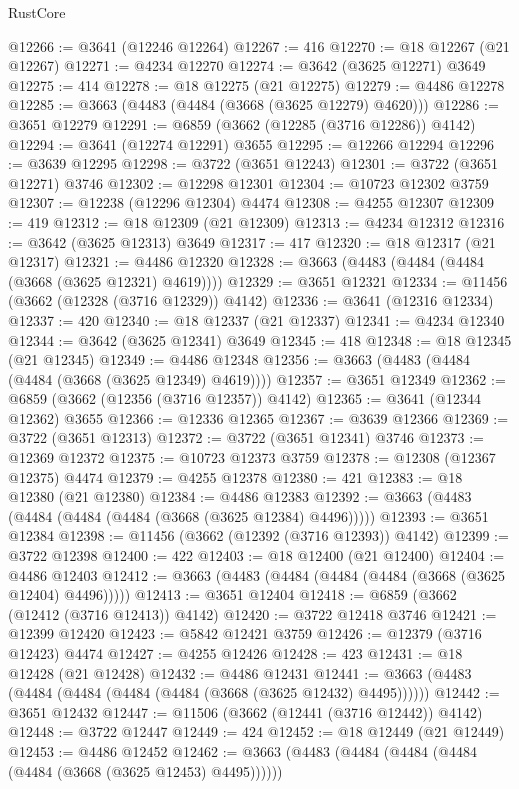 \begin{lexlean}{RustCore}
\begin{coremodule}
@12266 := @3641 (@12246 @12264)
@12267 := 416
@12270 := @18 @12267 (@21 @12267)
@12271 := @4234 @12270
@12274 := @3642 (@3625 @12271) @3649
@12275 := 414
@12278 := @18 @12275 (@21 @12275)
@12279 := @4486 @12278
@12285 := @3663 (@4483 (@4484 (@3668 (@3625 @12279) @4620)))
@12286 := @3651 @12279
@12291 := @6859 (@3662 (@12285 (@3716 @12286)) @4142)
@12294 := @3641 (@12274 @12291) @3655
@12295 := @12266 @12294
@12296 := @3639 @12295
@12298 := @3722 (@3651 @12243)
@12301 := @3722 (@3651 @12271) @3746
@12302 := @12298 @12301
@12304 := @10723 @12302 @3759
@12307 := @12238 (@12296 @12304) @4474
@12308 := @4255 @12307
@12309 := 419
@12312 := @18 @12309 (@21 @12309)
@12313 := @4234 @12312
@12316 := @3642 (@3625 @12313) @3649
@12317 := 417
@12320 := @18 @12317 (@21 @12317)
@12321 := @4486 @12320
@12328 := @3663 (@4483 (@4484 (@4484 (@3668 (@3625 @12321) @4619))))
@12329 := @3651 @12321
@12334 := @11456 (@3662 (@12328 (@3716 @12329)) @4142)
@12336 := @3641 (@12316 @12334)
@12337 := 420
@12340 := @18 @12337 (@21 @12337)
@12341 := @4234 @12340
@12344 := @3642 (@3625 @12341) @3649
@12345 := 418
@12348 := @18 @12345 (@21 @12345)
@12349 := @4486 @12348
@12356 := @3663 (@4483 (@4484 (@4484 (@3668 (@3625 @12349) @4619))))
@12357 := @3651 @12349
@12362 := @6859 (@3662 (@12356 (@3716 @12357)) @4142)
@12365 := @3641 (@12344 @12362) @3655
@12366 := @12336 @12365
@12367 := @3639 @12366
@12369 := @3722 (@3651 @12313)
@12372 := @3722 (@3651 @12341) @3746
@12373 := @12369 @12372
@12375 := @10723 @12373 @3759
@12378 := @12308 (@12367 @12375) @4474
@12379 := @4255 @12378
@12380 := 421
@12383 := @18 @12380 (@21 @12380)
@12384 := @4486 @12383
@12392 := @3663 (@4483 (@4484 (@4484 (@4484 (@3668 (@3625 @12384) @4496)))))
@12393 := @3651 @12384
@12398 := @11456 (@3662 (@12392 (@3716 @12393)) @4142)
@12399 := @3722 @12398
@12400 := 422
@12403 := @18 @12400 (@21 @12400)
@12404 := @4486 @12403
@12412 := @3663 (@4483 (@4484 (@4484 (@4484 (@3668 (@3625 @12404) @4496)))))
@12413 := @3651 @12404
@12418 := @6859 (@3662 (@12412 (@3716 @12413)) @4142)
@12420 := @3722 @12418 @3746
@12421 := @12399 @12420
@12423 := @5842 @12421 @3759
@12426 := @12379 (@3716 @12423) @4474
@12427 := @4255 @12426
@12428 := 423
@12431 := @18 @12428 (@21 @12428)
@12432 := @4486 @12431
@12441 := @3663 (@4483 (@4484 (@4484 (@4484 (@4484 (@3668 (@3625 @12432) @4495))))))
@12442 := @3651 @12432
@12447 := @11506 (@3662 (@12441 (@3716 @12442)) @4142)
@12448 := @3722 @12447
@12449 := 424
@12452 := @18 @12449 (@21 @12449)
@12453 := @4486 @12452
@12462 := @3663 (@4483 (@4484 (@4484 (@4484 (@4484 (@3668 (@3625 @12453) @4495))))))

\end{coremodule}
\end{lexlean}
